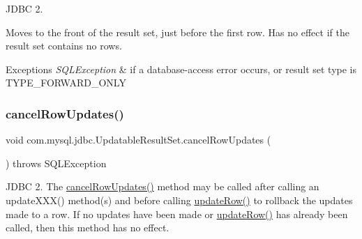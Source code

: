 J\+D\+BC 2.

Moves to the front of the result set, just before the first row. Has no effect if the result set contains no rows. 


\begin{DoxyExceptions}{Exceptions}
{\em S\+Q\+L\+Exception} & if a database-\/access error occurs, or result set type is T\+Y\+P\+E\+\_\+\+F\+O\+R\+W\+A\+R\+D\+\_\+\+O\+N\+LY \\
\hline
\end{DoxyExceptions}
\mbox{\label{classcom_1_1mysql_1_1jdbc_1_1_updatable_result_set_a0d0f5404555c896fc24a8ffd4605f7a7}} 
\subsubsection{\texorpdfstring{cancel\+Row\+Updates()}{cancelRowUpdates()}}
{\footnotesize\ttfamily void com.\+mysql.\+jdbc.\+Updatable\+Result\+Set.\+cancel\+Row\+Updates (\begin{DoxyParamCaption}{ }\end{DoxyParamCaption}) throws S\+Q\+L\+Exception}

J\+D\+BC 2. The \mbox{\hyperlink{classcom_1_1mysql_1_1jdbc_1_1_updatable_result_set_a0d0f5404555c896fc24a8ffd4605f7a7}{cancel\+Row\+Updates()}} method may be called after calling an update\+X\+X\+X() method(s) and before calling \mbox{\hyperlink{classcom_1_1mysql_1_1jdbc_1_1_updatable_result_set_a919969ba4b3c7cbc7b18605e9f31a746}{update\+Row()}} to rollback the updates made to a row. If no updates have been made or \mbox{\hyperlink{classcom_1_1mysql_1_1jdbc_1_1_updatable_result_set_a919969ba4b3c7cbc7b18605e9f31a746}{update\+Row()}} has already been called, then this method has no effect.


